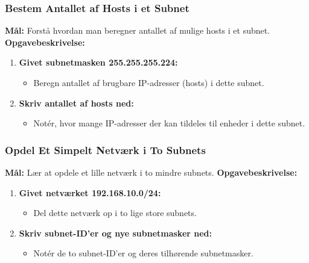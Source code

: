 \subsubsection*{Bestem Antallet af Hosts i et Subnet}
\textbf{Mål:} Forstå hvordan man beregner antallet af mulige hosts i et subnet.
\newline\newline\noindent
\textbf{Opgavebeskrivelse:}
\begin{enumerate}
	\item \textbf{Givet subnetmasken 255.255.255.224:}
	\begin{itemize}
		\item Beregn antallet af brugbare IP-adresser (hosts) i dette subnet.
	\end{itemize}
	\item \textbf{Skriv antallet af hosts ned:}
	\begin{itemize}
		\item Notér, hvor mange IP-adresser der kan tildeles til enheder i dette subnet.
	\end{itemize}
\end{enumerate}

\subsubsection*{Opdel Et Simpelt Netværk i To Subnets}
\textbf{Mål:} Lær at opdele et lille netværk i to mindre subnets.
\newline\newline\noindent
\textbf{Opgavebeskrivelse:}
\begin{enumerate}
	\item \textbf{Givet netværket 192.168.10.0/24:}
	\begin{itemize}
		\item Del dette netværk op i to lige store subnets.
	\end{itemize}
	\item \textbf{Skriv subnet-ID'er og nye subnetmasker ned:}
	\begin{itemize}
		\item Notér de to subnet-ID'er og deres tilhørende subnetmasker.
	\end{itemize}
\end{enumerate}


